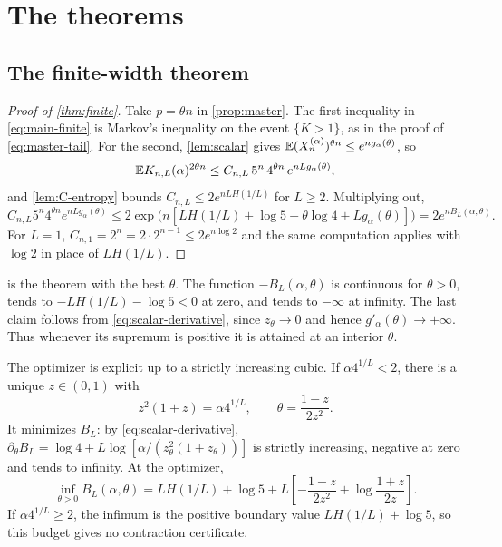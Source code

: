 \section{The theorems}
\label{sec:theorems}

\subsection{The finite-width theorem}

\begin{proof}[Proof of \cref{thm:finite}]
Take $p=\theta n$ in \cref{prop:master}. The first inequality in \cref{eq:main-finite} is Markov's inequality on the event $\{K>1\}$, as in the proof of \cref{eq:master-tail}. For the second, \cref{lem:scalar} gives $\mathbb{E}(X_n^{(\alpha)})^{\theta n}\le e^{ng_\alpha(\theta)}$, so
\[
\mathbb{E} K_{n,L}(\alpha)^{2\theta n}\le C_{n,L}\,5^n\,4^{\theta n}\,e^{nLg_\alpha(\theta)},
\]
and \cref{lem:C-entropy} bounds $C_{n,L}\le 2e^{nLH(1/L)}$ for $L\ge2$. Multiplying out,
\[
C_{n,L}5^n4^{\theta n}e^{nLg_\alpha(\theta)}\le 2\exp\bigl(n[LH(1/L)+\log5+\theta\log4+Lg_\alpha(\theta)]\bigr)=2e^{nB_L(\alpha,\theta)}.
\]
For $L=1$, $C_{n,1}=2^n=2\cdot2^{n-1}\le2e^{n\log2}$ and the same computation applies with $\log2$ in place of $LH(1/L)$.
\end{proof}

 is the theorem with the best $\theta$. The function $-B_L(\alpha,\theta)$ is continuous for $\theta>0$, tends to $-LH(1/L)-\log5<0$ at zero, and tends to $-\infty$ at infinity. The last claim follows from \cref{eq:scalar-derivative}, since $z_\theta\to0$ and hence $g'_\alpha(\theta)\to+\infty$. Thus whenever its supremum is positive it is attained at an interior $\theta$.

The optimizer is explicit up to a strictly increasing cubic. If $\alpha4^{1/L}<2$, there is a unique $z\in(0,1)$ with
\begin{equation}\label{eq:budget-optimizer}
z^2(1+z)=\alpha4^{1/L},\qquad \theta=\frac{1-z}{2z^2}.
\end{equation}
It minimizes $B_L$: by \cref{eq:scalar-derivative}, $\partial_\theta B_L=\log4+L\log[\alpha/(z_\theta^2(1+z_\theta))]$ is strictly increasing, negative at zero and tends to infinity. At the optimizer,
\begin{equation}\label{eq:budget-optimal}
\inf_{\theta>0}B_L(\alpha,\theta)
=LH(1/L)+\log5+L\left[-\frac{1-z}{2z^2}+\log\frac{1+z}{2z}\right].
\end{equation}
If $\alpha4^{1/L}\ge2$, the infimum is the positive boundary value $LH(1/L)+\log5$, so this budget gives no contraction certificate.

